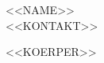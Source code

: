 \documentclass[a4paper,10pt]{article}
\begin{document}
\begin{center}
  {\LARGE <<NAME>>}\\[2pt]
  \footnotesize <<KONTAKT>>
\end{center}

<<KOERPER>>
\end{document}
